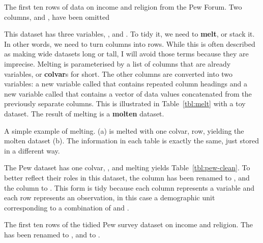 \documentclass[article]{jss}
\begin{document}
\begin{table}[htbp]
  \centering
  
  \caption{The first ten rows of data on income and religion from the Pew Forum. Two columns,  and , have been omitted} 
  \label{tbl:pew-raw}
\end{table}

This dataset has three variables, ,  and . To tidy it, we need to \textbf{melt}, or stack it. In other words, we need to turn columns into rows. While this is often described as making wide datasets long or tall, I will avoid those terms because they are imprecise. Melting is parameterised by a list of columns that are already variables, or \textbf{colvar}s for short. The other columns are converted into two variables: a new variable called  that contains repeated column headings and a new variable called  that contains a vector of data values concatenated from the previously separate columns. This is illustrated in Table~\ref{tbl:melt} with a toy dataset. The result of melting is a \textbf{molten} dataset.

\begin{table}
  \centering
  \hspace{2em}%

  \caption{A simple example of melting. (a) is melted with one colvar, row, yielding the molten dataset (b). The information in each table is exactly the same, just stored in a different way.}
  \label{tbl:melt} 
\end{table}

The Pew dataset has one colvar, , and melting yields Table~\ref{tbl:pew-clean}. To better reflect their roles in this dataset, the  column has been renamed to , and the  column to . This form is tidy because each column represents a variable and each row represents an observation, in this case a demographic unit corresponding to a combination of  and .

\begin{table}[htbp]
  \centering
  
  \caption{The first ten rows of the tidied Pew survey dataset on income and religion. The  has been renamed to , and  to .}
  \label{tbl:pew-clean}
\end{table}
\end{document}
